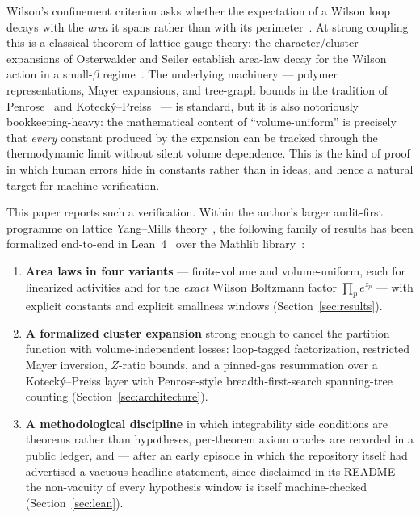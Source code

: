 \documentclass[11pt]{article}
\theoremstyle{remark}
\begin{document}
Wilson's confinement criterion asks whether the expectation of a Wilson
loop decays with the \emph{area} it spans rather than with its
perimeter~\cite{Wilson1974}.  At strong coupling this is a classical
theorem of lattice gauge theory: the character/cluster expansions of
Osterwalder and Seiler establish area-law decay for the Wilson action in a
small-$\beta$ regime~\cite{OsterwalderSeiler1978,Seiler1982}.  The
underlying machinery --- polymer representations, Mayer expansions, and
tree-graph bounds in the tradition of Penrose~\cite{Penrose1967} and
Koteck\'y--Preiss~\cite{KoteckyPreiss1986} --- is standard, but it is also
notoriously bookkeeping-heavy: the mathematical content of
``volume-uniform'' is precisely that \emph{every} constant produced by the
expansion can be tracked through the thermodynamic limit without silent
volume dependence.  This is the kind of proof in which human errors hide in
constants rather than in ideas, and hence a natural target for machine
verification.

This paper reports such a verification.  Within the author's larger
audit-first programme on lattice Yang--Mills
theory~\cite{Eriksson2026Master,Eriksson2026Audit}, the following family of
results has been formalized end-to-end in Lean~4~\cite{Lean4} over the
Mathlib library~\cite{mathlib}:

\begin{enumerate}
\item \textbf{Area laws in four variants} --- finite-volume and
  volume-uniform, each for linearized activities and for the \emph{exact}
  Wilson Boltzmann factor $\prod_p e^{z_p}$ --- with explicit constants and
  explicit smallness windows (Section~\ref{sec:results}).
\item \textbf{A formalized cluster expansion} strong enough to cancel the
  partition function with volume-independent losses: loop-tagged
  factorization, restricted Mayer inversion, $Z$-ratio bounds, and a
  pinned-gas resummation over a Koteck\'y--Preiss layer with Penrose-style
  breadth-first-search spanning-tree counting
  (Section~\ref{sec:architecture}).
\item \textbf{A methodological discipline} in which integrability side
  conditions are theorems rather than hypotheses, per-theorem axiom oracles
  are recorded in a public ledger, and --- after an early episode in which
  the repository itself had advertised a vacuous headline statement, since
  disclaimed in its README --- the non-vacuity of every hypothesis window
  is itself machine-checked (Section~\ref{sec:lean}).
\end{enumerate}
\end{document}
